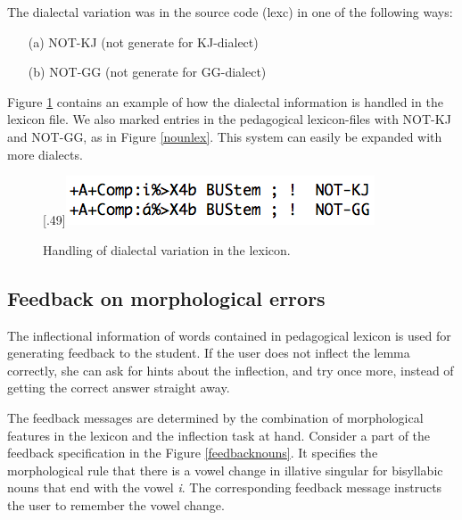 \documentclass[11pt]{article}
\begin{document}
The dialectal variation was in the source code (lexc) in one of the following ways:

\begin{itemize}
\item[(a)] NOT-KJ (not generate for KJ-dialect) 
\item[(b)] NOT-GG (not generate for GG-dialect)  
\end{itemize}

Figure \ref{smelex} contains an example of how the dialectal information is handled in the lexicon file. We also marked entries in the pedagogical lexicon-files with NOT-KJ and NOT-GG, as in Figure \ref{nounlex}. This system can easily be expanded with more dialects.

\begin{figure}[htbp]
\begin{center}
\scalebox{.49}[.49]{\includegraphics{presentation/img/smelex3.png}}\\
\caption{Handling of dialectal variation in the lexicon.}
\label{smelex}
\end{center}
\end{figure}

\subsection{Feedback on morphological errors}\label{mfeedback}

The inflectional information of words contained in pedagogical lexicon is used for generating feedback to the student. If the user does not inflect the lemma correctly, she can ask for hints about the inflection, and try once more, instead of getting the correct answer straight away. 

The feedback messages are determined by the combination of morphological features in the lexicon and the inflection task at hand. Consider a part of the feedback specification in the Figure \ref{feedbacknouns}. It specifies the morphological rule that there is a vowel change in illative singular for bisyllabic nouns that end with the vowel \textit{i}. The corresponding feedback message instructs the user to remember the vowel change.
\end{document}
